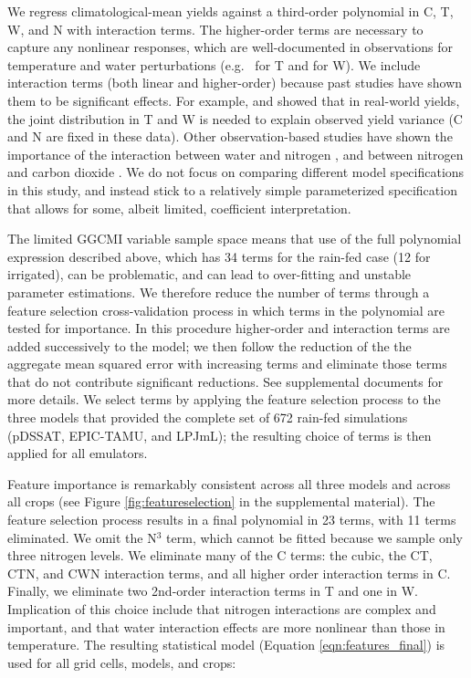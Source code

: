 \documentclass[preprint, 5p, times, twocolumn]{elsarticle}
\begin{document}
{We regress climatological-mean yields against a third-order polynomial in C, T, W, and N with interaction terms. The higher-order terms are necessary to capture any nonlinear responses, which are well-documented in observations for temperature and water perturbations (e.g.\ \citet{Schlenker2009} for T and \citet{He2016} for W). We include interaction terms (both linear and higher-order) because past studies have shown them to be significant effects. For example, \citet{Lobell2007} and \citet{Tebaldi2008} showed that in real-world yields, the joint distribution in T and W is needed to explain observed yield variance (C and N are fixed in these data). Other observation-based studies have shown the importance of the interaction between water and nitrogen \citep[e.g.][]{AULAKH2005}, and between nitrogen and carbon dioxide \citep{Mitsuru92, Nakamura97}. We do not focus on comparing different model specifications in this study, and instead stick to a relatively simple parameterized specification that allows for some, albeit limited, coefficient interpretation. 

The limited GGCMI variable sample space means that use of the full polynomial expression described above, which has 34 terms for the rain-fed case (12 for irrigated), can be problematic, and can lead to over-fitting and unstable parameter estimations. We therefore reduce the number of terms through a feature selection cross-validation process in which terms in the polynomial are tested for importance. In this procedure higher-order and interaction terms are added successively to the model; we then follow the reduction of the the aggregate mean squared error with increasing terms and eliminate those terms that do not contribute significant reductions. See supplemental documents for more details. We select terms by applying the feature selection process to the three models that provided the complete set of 672 rain-fed simulations (pDSSAT, EPIC-TAMU, and LPJmL); the resulting choice of terms is then applied for all emulators. 

Feature importance is remarkably consistent across all three models and across all crops (see Figure \ref{fig:featureselection} in the supplemental material). The feature selection process results in a final polynomial in 23 terms, with 11 terms eliminated. We omit the N$^3$ term, which cannot be fitted because we sample only three nitrogen levels. We eliminate many of the C terms: the cubic, the CT, CTN, and CWN interaction terms, and all higher order interaction terms in C.  Finally, we eliminate two 2nd-order interaction terms in T and one in W. Implication of this choice include that nitrogen interactions are complex and important, and that water interaction effects are more nonlinear than those in temperature. The resulting statistical model (Equation \ref{eqn:features_final}) is used for all grid cells, models, and crops: 

}
\end{document}
